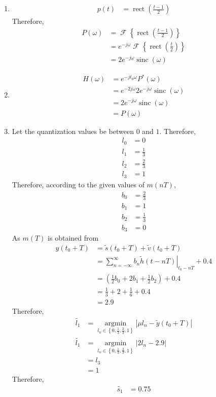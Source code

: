\documentclass[titlepage, fleqn, a4paper, 12pt, twoside]{article}
\theoremstyle{definition}
\theoremstyle{theorem}
\renewcommand{\tilde}{\widetilde}
\DeclareMathOperator{\FT}{\mathcal{F}}
\DeclareMathOperator{\sinc}{\mathrm{sinc}}
\DeclareMathOperator{\rect}{\mathrm{rect}}
\DeclareMathOperator*{\argmin}{\mathrm{argmin}}
\begin{document}
\begin{solution}
	\begin{enumerate}
		\item
			\begin{align*}
				p(t) &= \rect\left( \frac{t - 1}{2} \right)
			\end{align*}
			Therefore,
			\begin{align*}
				P(\omega) &= \FT\left\{ \rect\left( \frac{t - 1}{2} \right) \right\}\\
				&= e^{-j \omega} \FT\left\{ \rect\left( \frac{t}{2} \right) \right\}\\
				&= 2 e^{-j \omega} \sinc(\omega)
			\end{align*}
		\item
			\begin{align*}
				H(\omega) &= e^{-j t_0 \omega} P^*(\omega)\\
				&= e^{-2 j \omega} 2 e^{-j \omega} \sinc(\omega)\\
				&= 2 e^{-j \omega} \sinc(\omega)\\
				&= P(\omega)
			\end{align*}
		\item
			Let the quantization values be between $0$ and $1$.
			Therefore,
			\begin{align*}
				l_0 &= 0\\
				l_1 &= \frac{1}{3}\\
				l_2 &= \frac{2}{3}\\
				l_3 &= 1
			\end{align*}
			Therefore, according to the given values of $m(n T)$,
			\begin{align*}
				b_0 &= \frac{2}{3}\\
				b_1 &= 1\\
				b_2 &= \frac{1}{3}\\
				b_3 &= 0
			\end{align*}
			As $m(T)$ is obtained from
			\begin{align*}
				y(t_0 + T) &= \tilde{s}(t_0 + T) + \tilde{v}(t_0 + T)\\
				&= \left. \sum\limits_{n = -\infty}^{\infty} b_n \tilde{h}(t - n T) \right|_{t_0 - n T} + 0.4\\
				&= \left( \frac{1}{2} b_0 + 2 b_1 + \frac{1}{2} b_2 \right) + 0.4\\
				&= \frac{1}{3} + 2 + \frac{1}{6} + 0.4\\
				&= 2.9
			\end{align*}
			Therefore,
			\begin{align*}
				\tilde{l_1} &= \argmin\limits_{l_n \in \left\{ 0, \frac{1}{3}, \frac{2}{3}, 1 \right\}} \left| \mu l_n - \tilde{y}(t_0 + T) \right|\\
				\tilde{l_1} &= \argmin\limits_{l_n \in \left\{ 0, \frac{1}{3}, \frac{2}{3}, 1 \right\}} \left| 2 l_n - 2.9 \right|\\
				&= l_3\\
				&= 1
			\end{align*}
			Therefore,
			\begin{align*}
				\tilde{s_1} &= 0.75
			\end{align*}
	\end{enumerate}
\end{solution}
\end{document}
